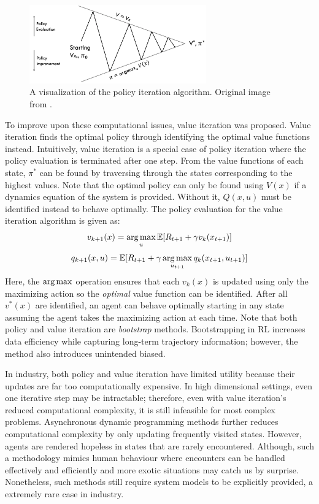 \begin{figure}[H]
    \centering
    \includegraphics[width=0.68\textwidth]{images/ch1/policy_iteration.jpeg}
    \caption{A visualization of the policy iteration algorithm. Original image from \cite{silver_class}.}
    \label{fig:policy_iteration}
\end{figure}   

To improve upon these computational issues, value iteration was proposed.  Value iteration finds the optimal policy through identifying the optimal value functions instead. Intuitively, value iteration is a special case of policy iteration where the policy evaluation is terminated after one step.  From the value functions of each state, $\pi^*$ can be found by traversing through the states corresponding to the highest values. Note that the optimal policy can only be found using $V(x)$ if a dynamics equation of the system is provided. Without it, $Q(x, u)$ must be identified instead to behave optimally. The policy evaluation for the value iteration algorithm is given as:
\begin{equation}
    v_{k+1}(x) = \operatorname*{arg\,max}_u \mathbb{E}[R_{t+1} + \gamma v_k(x_{t+1})]
\end{equation}
\begin{equation}
    q_{k+1}(x, u) = \mathbb{E}[R_{t+1} + \gamma \operatorname*{arg\,max}_{u_{t+1}} q_k(x_{t+1}, u_{t+1})]
\end{equation}
Here, the $\operatorname*{arg\,max}$ operation ensures that each $v_k(x)$ is updated using only the maximizing action so the \textit{optimal} value function can be identified. After all $v^*(x)$ are identified, an agent can behave optimally starting in any state assuming the agent takes the maximizing action at each time. Note that both policy and value iteration are \textit{bootstrap} methods. Bootstrapping in RL increases data efficiency while capturing long-term trajectory information; however, the method also introduces unintended biased. 

In industry, both policy and value iteration have limited utility because their updates are far too computationally expensive. In high dimensional settings, even one iterative step may be intractable; therefore, even with value iteration's reduced computational complexity, it is still infeasible for most complex problems. Asynchronous dynamic programming methods further reduces computational complexity by only updating frequently visited states. However, agents are rendered hopeless in states that are rarely encountered. Although, such a methodology mimics human behaviour where encounters can be handled effectively and efficiently and more exotic situations may catch us by surprise. Nonetheless, such methods still require system models to be explicitly provided, a extremely rare case in industry.

